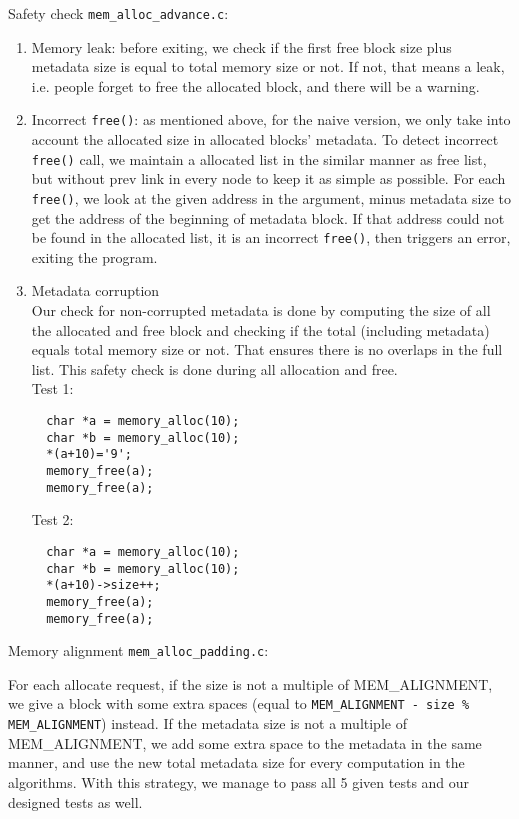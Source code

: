 \documentclass{article}
\begin{document}
\begin{flushleft}
Safety check \texttt{mem\_alloc\_advance.c}:

\begin{enumerate}
\item Memory leak: before exiting, we check if the first free block size plus metadata size is equal to total memory size or not. If not, that means a leak, i.e. people forget to free the allocated block, and there will be a warning.

\item Incorrect \texttt{free()}: as mentioned above, for the naive version, we only take into account the allocated size in allocated blocks' metadata. To detect incorrect \texttt{free()} call, we maintain a allocated list in the similar manner as free list, but without prev link in every node to keep it as simple as possible. For each \texttt{free()}, we look at the given address in the argument, minus metadata size to get the address of the beginning of metadata block. If that address could not be found in the allocated list, it is an incorrect \texttt{free()}, then triggers an error, exiting the program.

\item Metadata corruption\\
Our check for non-corrupted metadata is done by computing the size of all the allocated and free block and checking if the total (including metadata) equals total memory size or not. That ensures there is no overlaps in the full list. This safety check is done during all allocation and free.\\
Test 1:\\
\begin{lstlisting}
  char *a = memory_alloc(10);
  char *b = memory_alloc(10);
  *(a+10)='9';
  memory_free(a);
  memory_free(a);
\end{lstlisting}
Test 2:\\
\begin{lstlisting}
  char *a = memory_alloc(10);
  char *b = memory_alloc(10);
  *(a+10)->size++;
  memory_free(a);
  memory_free(a);
\end{lstlisting}

\end{enumerate}


\end{flushleft}

\begin{flushleft}
Memory alignment \texttt{mem\_alloc\_padding.c}:


For each allocate request, if the size is not a multiple of MEM\_ALIGNMENT, we give a block with some extra spaces (equal to \texttt{MEM\_ALIGNMENT - size \% MEM\_ALIGNMENT}) instead. If the metadata size is not a multiple of MEM\_ALIGNMENT, we add some extra space to the metadata in the same manner, and use the new total metadata size for every computation in the algorithms. With this strategy, we manage to pass all 5 given tests and our designed tests as well.


\end{flushleft}
\end{document}
